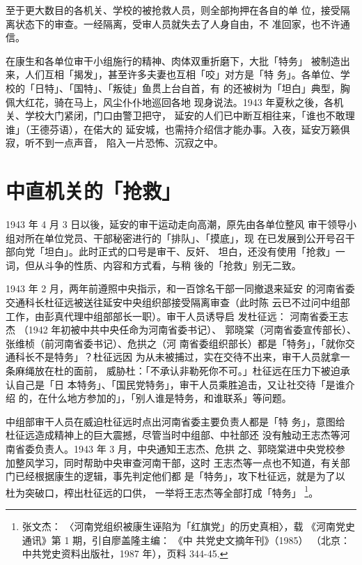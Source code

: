 至于更大数目的各机关、学校的被抢救人员，则全部拘押在各自的单
位，接受隔离状态下的审查。一经隔离，受审人员就失去了人身自由，不
准回家，也不许通信。

在康生和各单位审干小组施行的精神、肉体双重折磨下，大批「特务」
被制造出来，人们互相「揭发」，甚至许多夫妻也互相「咬」对方是「特
务」。各单位、学校的「日特」、「国特」、「叛徒」鱼贯上台自首，有
的还被树为「坦白」典型，胸佩大红花，骑在马上，风尘仆仆地巡回各地
现身说法。1943 年夏秋之後，各机关、学校大门紧闭，门口由警卫把守，
延安的人们已中断互相往来，「谁也不敢理谁」（王德芬语），在偌大的
延安城，也需持介绍信才能办事。入夜，延安万籁俱寂，听不到一点声音，
陷入一片恐怖、沉寂之中。

\section{中直机关的「抢救」}

1943 年 4 月 3 日以後，延安的审干运动走向高潮，原先由各单位整风
审干领导小组对所在单位党员、干部秘密进行的「排队」、「摸底」，现
在已发展到公开号召干部向党「坦白」。此时正式的口号是审干、反奸、
坦白，还没有使用「抢救」一词，但从斗争的性质、内容和方式看，与稍
後的「抢救」别无二致。
 
1943 年 2 月，两年前遵照中央指示，和一百馀名干部一同撤退来延安
的河南省委交通科长杜征远被送往延安中央组织部接受隔离审查（此时陈
云已不过问中组部工作，由彭真代理中组部部长一职）。审干人员诱导启
发杜征远：
河南省委王志杰
（1942 年初被中共中央任命为河南省委书记）、
郭晓棠（河南省委宣传部长）、张维桢（前河南省委书记）、危拱之（河
南省委组织部长）都是「特务」，「就你交通科长不是特务」？杜征远因
为从未被捕过，实在交待不出来，审干人员就拿一条麻绳放在杜的面前，
威胁杜：「不承认非勒死你不可。」杜征远在压力下被迫承认自己是「日
本特务」、「国民党特务」，审干人员乘胜追击，又让社交待「是谁介绍
的，在什么地方参加的」，「别人谁是特务，和谁联系」等问题。

中组部审干人员在威迫杜征远时点出河南省委主要负责人都是「特 务」，意图给
杜征远造成精神上的巨大震撼，尽管当时中组部、中社部还 没有触动王志杰等河
南省委负责人。1943 年 3 月，中央通知王志杰、危拱 之、郭晓棠进中央党校参
加整风学习，同时帮助中央审查河南干部，这时 王志杰等一点也不知道，有关部
门已经根据康生的逻辑，事先判定他们都 是「特务」，攻下杜征远，就是为了以
杜为突破口，榨出杜征远的口供， 一举将王志杰等全部打成「特务」
\footnote{张文杰： 〈河南党组织被康生诬陷为「红旗党」的历史真相〉，载
《河南党史通讯》第 1 期，引自廖盖隆主编： 《中 共党史文摘年刊》（1985）
（北京：中共党史资料出版社，1987 年），页料 344-45.}。

